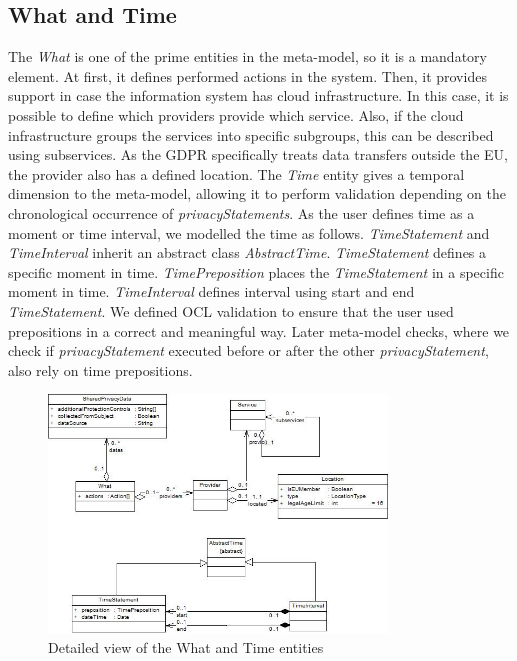 \documentclass[11pt,english]{article}
\begin{document}
\subsection{What and Time}
The \emph{What} is one of the prime entities in the meta-model, so it is a mandatory element. At first, it defines performed actions in the system. Then, it provides support in case the information system has cloud infrastructure. In this case, it is possible to define which providers provide which service. Also, if the cloud infrastructure groups the services into specific subgroups, this can be described using subservices. As the GDPR specifically treats data transfers outside the EU, the provider also has a defined location. \newline The \emph{Time} entity gives a temporal dimension to the meta-model, allowing it to perform validation depending on the chronological occurrence of \emph{privacyStatements}. As the user defines time as a moment or time interval, we modelled the time as follows. \emph{TimeStatement} and \emph{TimeInterval} inherit an abstract class \emph{AbstractTime}. \emph{TimeStatement} defines a specific moment in time. \emph{TimePreposition} places the \emph{TimeStatement} in a specific moment in time. \emph{TimeInterval} defines interval using start and end \emph{TimeStatement}. We defined OCL validation to ensure that the user used prepositions in a correct and meaningful way. Later meta-model checks, where we check if \emph{privacyStatement} executed before or after the other \emph{privacyStatement}, also rely on time prepositions.
\begin{figure}[H]
    \centering
    \includegraphics[width=9cm,scale=0.5]{images/whatAndTime.jpg}
    \caption{Detailed view of the What and Time entities}
    \label{fig:WhatAndTime}
\end{figure}
\end{document}
